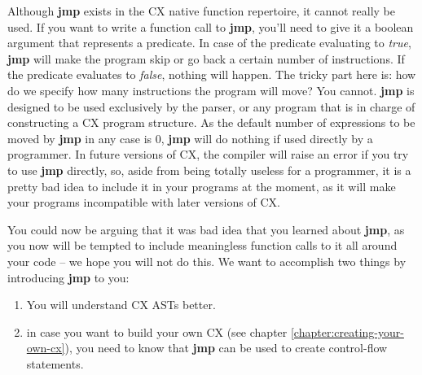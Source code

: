 \documentclass[11pt,fleqn,openany]{book} %
\begin{document}

Although \textbf{jmp} exists in the CX native function repertoire, it cannot really be used. If you want to write a function call to \textbf{jmp}, you'll need to give it a boolean argument that represents a predicate. In case of the predicate evaluating to \emph{true}, \textbf{jmp} will make the program skip or go back a certain number of instructions. If the predicate evaluates to \emph{false}, nothing will happen. The tricky part here is: how do we specify how many instructions the program will move? You cannot. \textbf{jmp} is designed to be used exclusively by the parser, or any program that is in charge of constructing a CX program structure. As the default number of expressions to be moved by \textbf{jmp} in any case is 0, \textbf{jmp} will do nothing if used directly by a programmer. In future versions of CX, the compiler will raise an error if you try to use \textbf{jmp} directly, so, aside from being totally useless for a programmer, it is a pretty bad idea to include it in your programs at the moment, as it will make your programs incompatible with later versions of CX.

You could now be arguing that it was bad idea that you learned about \textbf{jmp}, as you now will be tempted to include meaningless function calls to it all around your code -- we hope you will not do this. We want to accomplish two things by introducing \textbf{jmp} to you:
\begin{enumerate}
    \item You will understand CX ASTs better.
    \item in case you want to build your own CX (see chapter \ref{chapter:creating-your-own-cx}), you need to know that \textbf{jmp} can be used to create control-flow statements.
\end{enumerate}
\end{document}
